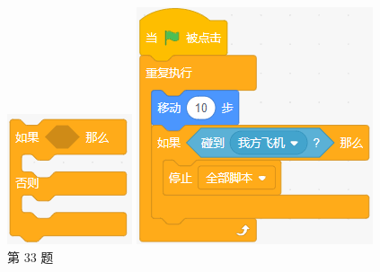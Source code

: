 \documentclass[10pt, a4paper]{article}
\begin{document}
\begin{enumerate}
        \begin{figure}[htbp]
            \centering
            \begin{minipage}[t]{.13\textwidth}
                \centering
                \includegraphics[width=\textwidth]{figure/33.png}
                \caption*{第 33 题}
            \end{minipage}
            \begin{minipage}[t]{.36\textwidth}
                \centering
                \begin{minipage}[t]{.4\textwidth}
                    \centering
                    \includegraphics[width=\textwidth]{figure/34-1.png}

\end{minipage}
\end{minipage}
\end{figure}
\end{enumerate}
\end{document}
